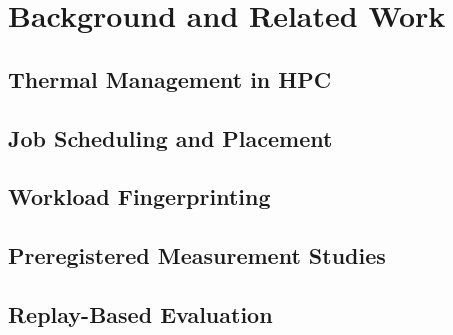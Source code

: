 
\section{Background and Related Work}
\label{sec:background}

\subsection{Thermal Management in HPC}

\subsection{Job Scheduling and Placement}

\subsection{Workload Fingerprinting}

\subsection{Preregistered Measurement Studies}

\subsection{Replay-Based Evaluation}
